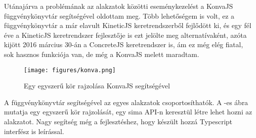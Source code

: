 Utánajárva a problémának az alakzatok közötti eseménykezelést a KonvaJS függvénykönyvtár segítségével oldottam meg. \cite{KonvaJS} Több lehetőségem is volt, ez a függvénykönyvtár a már elavult KineticJS keretrendszerből fejlődött ki, és egy fél éve a KineticJS keretrendszer fejlesztője is ezt jelölte meg alternatívaként, azóta kijött 2016 március 30-án a ConcreteJS keretrendszer is, ám ez még elég fiatal, sok hasznos funkciója van, de még a KonvaJS melett maradtam.

\begin{figure}[!ht]
\centering
\texttt{[image: figures/konva.png]}
\caption{Egy egyszerű kör rajzolása KonvaJS segítségével} 
\label{fig:Konva}
\end{figure} 

A függvénykönyvtár segítségével az egyes alakzatok csoportosíthatók. A -es ábra mutatja egy egyszerű kör rajzolását, egy sima API-n keresztül létre lehet hozni az alakzatot. Nagy segítség még a fejlesztéshez, hogy készült hozzá Typescript interfész is leírással.